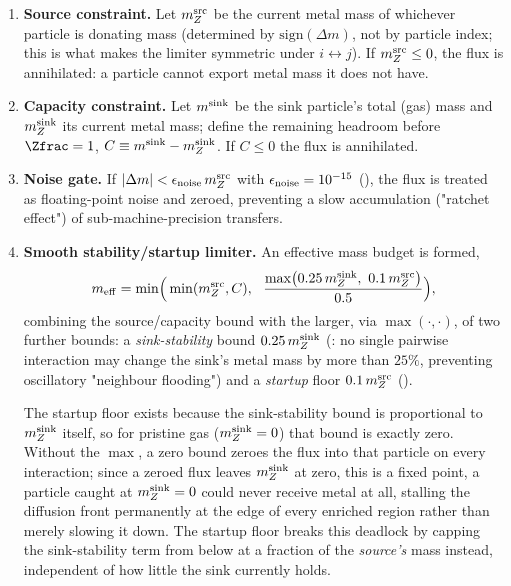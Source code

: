 \begin{enumerate}
  \item \textbf{Source constraint.} Let $m_{Z}^{\rm src}$ be the current
        metal mass of whichever particle is donating mass (determined
        by $\mathrm{sign}(\Delta m)$, not by particle index; this is
        what makes the limiter symmetric under $i\leftrightarrow j$). If
        $m_Z^{\rm src}\le 0$, the flux is annihilated: a particle cannot
        export metal mass it does not have.
  \item \textbf{Capacity constraint.} Let $m^{\rm sink}$ be the sink
        particle's total (gas) mass and $m_Z^{\rm sink}$ its current
        metal mass; define the remaining headroom before $\Zfrac=1$,
        $C \equiv m^{\rm sink} - m_Z^{\rm sink}$. If $C\le 0$ the flux is
        annihilated.
  \item \textbf{Noise gate.} If
        $|\Delta m| < \epsilon_{\rm noise}\, m_Z^{\rm src}$ with
        $\epsilon_{\rm noise}=10^{-15}$
        (), the flux is treated as
        floating-point noise and zeroed, preventing a slow
        accumulation ("ratchet effect") of sub-machine-precision
        transfers.
  \item \textbf{Smooth stability/startup limiter.} An effective mass
        budget is formed,
        \begin{equation}
          m_{\rm eff} = \min\!\Big(\min(m_Z^{\rm src}, C),\ \
          \frac{\max\!\big(0.25\, m_Z^{\rm sink},\ 0.1\, m_Z^{\rm src}\big)}{0.5}\Big) ,
        \end{equation}
        combining the source/capacity bound with the larger, via
        $\max(\cdot,\cdot)$, of two further bounds: a
        \emph{sink-stability} bound $0.25\, m_Z^{\rm sink}$
        (: no single
        pairwise interaction may change the sink's metal mass by more
        than $25\%$, preventing oscillatory "neighbour flooding") and a
        \emph{startup} floor $0.1\, m_Z^{\rm src}$
        ().

        The startup floor exists because the sink-stability bound is
        proportional to $m_Z^{\rm sink}$ itself, so for pristine gas
        ($m_Z^{\rm sink}=0$) that bound is exactly zero. Without the
        $\max$, a zero bound zeroes the flux into that particle on
        every interaction; since a zeroed flux leaves $m_Z^{\rm sink}$
        at zero, this is a fixed point, a particle caught at
        $m_Z^{\rm sink}=0$ could never receive metal at all, stalling
        the diffusion front permanently at the edge of every enriched
        region rather than merely slowing it down. The startup floor
        breaks this deadlock by capping the sink-stability term from
        below at a fraction of the \emph{source's} mass instead,
        independent of how little the sink currently holds.


\end{enumerate}
